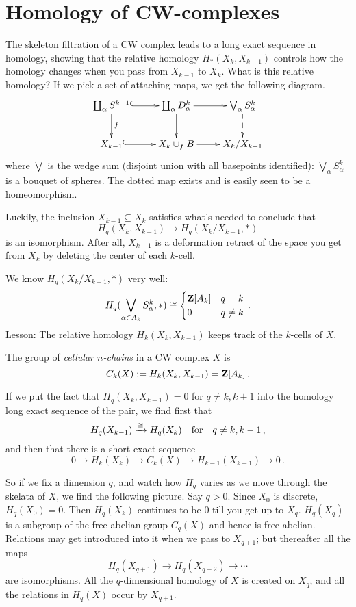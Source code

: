 \section{Homology of CW-complexes}


The skeleton filtration of a CW complex leads to a long exact sequence in 
homology, showing that the relative homology $H_*(X_k,X_{k-1})$ controls how
the homology changes when you  pass from $X_{k-1}$ to $X_k$. What is this
relative homology? If we pick a set of attaching maps, we get the following 
diagram.
\begin{equation*}
\xymatrix{\coprod_{\alpha}S^{k-1}\ar@{^(->}[r]\ar[d]^f & \coprod_{\alpha}D^k_\alpha\ar[r]\ar[d] & \bigvee_{\alpha}S^k_\alpha\ar@{-->}[d]\\
X_{k-1}\ar@{^(->}[r] & X_k\cup_f B\ar[r] & X_k/X_{k-1}}
\end{equation*}
where $\bigvee$ is the wedge sum (disjoint union with all basepoints identified): $\bigvee_{\alpha}S^k_\alpha$ is a bouquet of spheres. The dotted
map exists and is easily seen to be a homeomorphism. 

Luckily, the inclusion $X_{k-1}\subseteq X_k$ satisfies what's needed to conclude that 
\[
H_q(X_k,X_{k-1})\to H_q(X_k/X_{k-1},\ast)
\]
is an isomorphism. After all, $X_{k-1}$ is a deformation retract of the space 
you get from $X_k$ by deleting the center of each $k$-cell. 

We know $ H_q(X_k/X_{k-1},\ast)$ very well:
\[
H_q(\bigvee_{\alpha\in A_k}S^k_\alpha,*)\cong\begin{cases}\mathbf Z[A_k] & q=k \\ 0 & q\neq k\end{cases}\,.
\]
Lesson: The relative homology $ H_k(X_k,X_{k-1})$ keeps track of the $k$-cells of $X$.
\begin{definition}
The group of {\em cellular $n$-chains} in a CW complex $X$ is
\[
C_k(X):= H_k(X_k,X_{k-1})=\mathbf Z[A_k]\,.
\]
\end{definition}
If we put the fact that $H_q(X_k,X_{k-1})=0$ for $q\neq k,k+1$
into the homology long exact sequence of the pair, we find first that
\[
H_q(X_{k-1})\xrightarrow{\cong}H_q(X_k)\quad\hbox{for}\quad q\neq k,k-1\,,
\]
and then that there is a short exact sequence
\[
0\to H_k(X_k)\to C_k(X) \to H_{k-1}(X_{k-1}) \to 0\,.
\]

So if we fix a dimension $q$, and watch how $H_q$ varies as we move through the
skelata of $X$, we find the following picture. Say $q>0$. Since $X_0$ is
discrete, $H_q(X_0)=0$. Then $H_q(X_k)$ continues to be 0 till you get up to
$X_q$. $H_q(X_q)$ is a subgroup of the free abelian group $C_q(X)$ and hence is
free abelian. Relations may get introduced into it when we pass to $X_{q+1}$; 
but thereafter all the maps 
\[
H_q(X_{q+1})\to H_q(X_{q+2})\to\cdots
\]
are isomorphisms. All the $q$-dimensional homology of $X$ is created on $X_q$,
and all the relations in $H_q(X)$ occur by $X_{q+1}$. 


